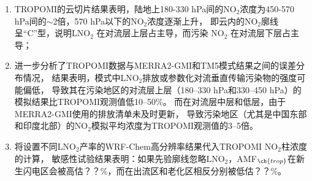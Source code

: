\begin{enumerate}[label=（\arabic*）, labelindent=\parindent, leftmargin=0pt, widest=0, itemindent=*, topsep=0pt, partopsep=0pt, parsep=0pt]

\item TROPOMI的云切片结果表明，陆地上180-330 hPa间的NO$_2$浓度为450-570 hPa间的$\sim$2倍，570 hPa以下的NO$_2$浓度逐渐上升，
即云内的NO$_2$廓线呈“C”型，说明LNO$_2$ 在对流层上层占主导，而污染 NO$_2$ 在对流层下层占主导；

\item 进一步分析了TROPOMI数据与MERRA2-GMI和TM5模式结果之间的误差分布情况，
结果表明，模式中LNO$_2$排放或参数化对流垂直传输污染物的强度可能偏低，
导致其在污染地区的对流层上层（180--330 hPa和330--450 hPa）的模拟结果比TROPOMI观测值低10--50\%。
而在对流层中层和低层，由于MERRA2-GMI使用的排放清单未及时更新，
导致污染地区（尤其是中国东部和印度北部）的NO$_2$模拟平均浓度为TROPOMI观测值的3--5倍。

\item 将设置不同LNO$_2$产率的WRF-Chem高分辨率结果代入TROPOMI NO$_2$柱浓度的计算，
敏感性试验结果表明：如果先验廓线忽略LNO$_2$，AMF$_{\ch{trop}}$在新生闪电区会被高估？？\%，而在出流区和老化区相反分别被低估？？\%。

\end{enumerate}
